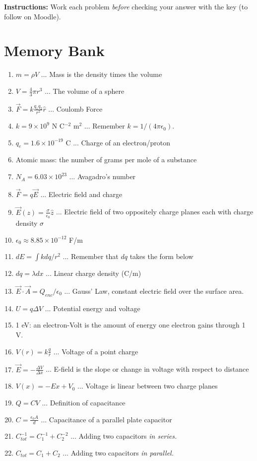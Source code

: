 \documentclass[10pt]{article}
\begin{document}
\maketitle

\textbf{Instructions:} Work each problem \textit{before} checking your answer with the key (to follow on Moodle). \\ \vspace{0.25cm}

\section{Memory Bank}

\begin{enumerate}
\item $m = \rho V$ ... Mass is the density times the volume
\item $V = \frac{4}{3}\pi r^3$ ... The volume of a sphere
\item $\vec{F} = k \frac{q_1 q_2}{r^2}\hat{r}$ ... Coulomb Force
\item $k = 9 \times 10^{9}$ N C$^{-2}$ m$^{2}$ ... Remember $k = 1/(4\pi \epsilon_0)$.
\item $q_e = 1.6 \times 10^{-19}$ C ... Charge of an electron/proton
\item Atomic mass: the number of grams per mole of a substance
\item $N_A = 6.03 \times 10^{23}$ ... Avagadro's number
\item $\vec{F} = q \vec{E}$ ... Electric field and charge
\item $\vec{E}(z) = \frac{\sigma}{\epsilon_0}\hat{z}$ ... Electric field of two oppositely charge planes each with charge density $\sigma$
\item $\epsilon_0 \approx 8.85 \times 10^{-12}$ F/m
\item $dE = \int k dq / r^2$ ... Remember that $dq$ takes the form below
\item $dq = \lambda dx$ ... Linear charge density (C/m)
\item $\vec{E} \cdot \vec{A} = Q_{enc}/\epsilon_0$ ... Gauss' Law, constant electric field over the surface area.
\item $U = q\Delta V$ ... Potential energy and voltage
\item 1 eV: an electron-Volt is the amount of energy one electron gains through 1 V.
\item $V(r) = k\frac{q}{r}$ ... Voltage of a point charge
\item $\vec{E} = -\frac{\Delta V}{\Delta x}$ ... E-field is the slope or change in voltage with respect to distance
\item $V(x) = -E x + V_0$ ... Voltage is linear between two charge planes
\item $Q = CV$ ... Definition of capacitance
\item $C = \frac{\epsilon_0 A}{d}$ ... Capacitance of a parallel plate capacitor
\item $C_{tot}^{-1} = C_1^{-1} + C_2^{-2}$ ... Adding two capacitors \textit{in series.}
\item $C_{tot} = C_1 + C_2$ ... Adding two capacitors \textit{in parallel.}
\end{enumerate}
\end{document}
